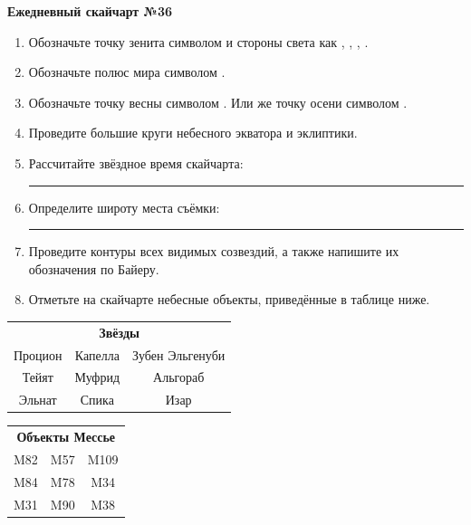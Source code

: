 \documentclass{./SAS-class-skygen}
\begin{document}
    
    
    
	\begin{center}
		\large\textbf{Ежедневный скайчарт №36}
	\end{center}

	\begin{enumerate}
		\item Обозначьте точку зенита символом  и стороны света как , , , .
		\item Обозначьте полюс мира символом .
		\item Обозначьте точку весны символом \Aries. Или же точку осени символом \Libra.
		\item Проведите большие круги небесного экватора и эклиптики.
		\item Рассчитайте звёздное время скайчарта: \rule{2cm}{0.4pt}
		\item Определите широту места съёмки: \rule{2cm}{0.4pt}
		\item Проведите контуры всех видимых созвездий, а также напишите их обозначения по Байеру.
		\item Отметьте на скайчарте небесные объекты, приведённые в таблице ниже.
	\end{enumerate}
	
    \vspace{0.5cm}

    \begin{table}[h!]
    \centering
    \begin{tabular}{ccc}
    \multicolumn{3}{c}{\textbf{Звёзды}} \\ Процион & Капелла & Зубен Эльгенуби \\
Тейят & Муфрид & Альгораб \\
Эльнат & Спика & Изар \\

\end{tabular}
    \hfill
    \begin{tabular}{ccc}
    \multicolumn{3}{c}{\textbf{Объекты Мессье}} \\ M82 & M57 & M109 \\
M84 & M78 & M34 \\
M31 & M90 & M38 \\

\end{tabular}
    \end{table}
	
\end{document}
